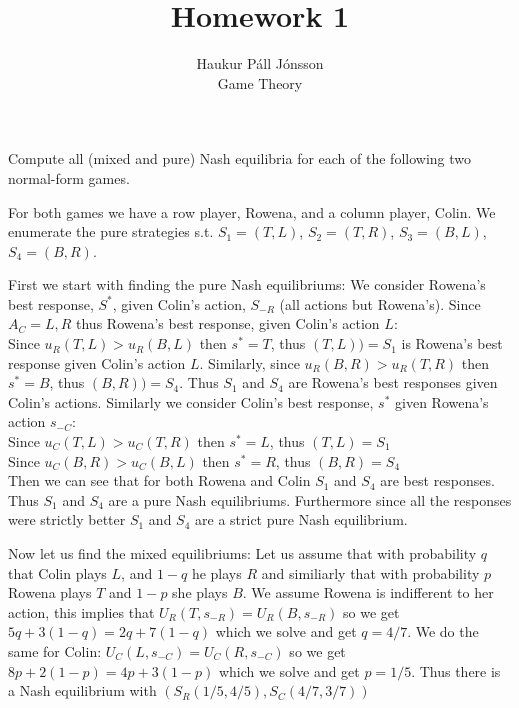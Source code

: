 \documentclass[12pt]{article}
\newenvironment{question}[2][Question]{\begin{trivlist}
\item[\hskip \labelsep {\bfseries #1}\hskip \labelsep {\bfseries #2.}]}{\end{trivlist}}
\newenvironment{answer}[2][Answer]{\begin{trivlist}
\item[\hskip \labelsep {\bfseries #1}\hskip \labelsep {\bfseries #2:}]}{\end{trivlist}}
\begin{document}
\let\oldsum\sum
\renewcommand{\sum}[3]{\oldsum\limits_{#1}^{#2}#3}

\title{Homework 1}
\author{Haukur Páll Jónsson\\
Game Theory}

\maketitle

\begin{question}{1}
Compute all (mixed and pure) Nash equilibria for each of the following two normal-form games.
\end{question}
\begin{answer}{}
For both games we have a row player, Rowena, and a column player, Colin. We enumerate the pure strategies s.t. $S_1=(T,L)$, $S_2=(T,R)$, $S_3=(B,L)$, $S_4=(B,R)$.
\end{answer}
\begin{answer}{a)}
First we start with finding the pure Nash equilibriums:
We consider Rowena's best response, $S^*$, given Colin's action, $S_{-R}$ (all actions but Rowena's). Since $A_C={L, R}$ thus Rowena's best response, given Colin's action $L$: \\
Since $u_R(T,L) > u_R(B,L)$ then $s^*=T$, thus $(T,L))=S_1$ is Rowena's best response given Colin's action $L$.
Similarly, since $u_R(B,R) > u_R(T,R)$ then $s^*=B$, thus $(B,R))=S_4$. Thus $S_1$ and $S_4$ are Rowena's best responses given Colin's actions.
Similarly we consider Colin's best response, $s^*$ given Rowena's action $s_{-C}$: \\
Since $u_C(T,L) > u_C(T,R)$ then $s^*=L$, thus $(T,L)=S_1$ \\
Since $u_C(B,R) > u_C(B,L)$ then $s^*=R$, thus $(B,R)=S_4$ \\
Then we can see that for both Rowena and Colin $S_1$ and $S_4$ are best responses.
Thus $S_1$ and $S_4$ are a pure Nash equilibriums.
Furthermore since all the responses were strictly better $S_1$ and $S_4$ are a strict pure Nash equilibrium.

Now let us find the mixed equilibriums:
Let us assume that with probability $q$ that Colin plays $L$, and $1-q$ he plays $R$ and similiarly that with probability $p$ Rowena plays $T$ and $1-p$ she plays $B$.
We assume Rowena is indifferent to her action, this implies that $U_R(T,s_{-R})=U_R(B,s_{-R})$ so we get $5q+3(1-q)=2q+7(1-q)$ which we solve and get $q=4/7$.
We do the same for Colin: $U_C(L,s_{-C})=U_C(R,s_{-C})$ so we get $8p+2(1-p)=4p+3(1-p)$ which we solve and get $p=1/5$. Thus there is a Nash equilibrium with $(S_R(1/5,4/5), S_C(4/7,3/7))$

\end{answer}
\end{document}
